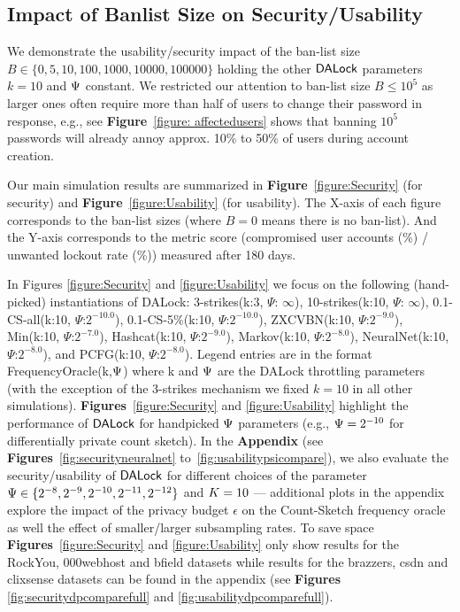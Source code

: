 	\vspace{-0.1cm}
\subsection{Impact of Banlist Size on Security/Usability}\label{section:ExperimentResult-usability} 
\vspace{-0.1cm}
We demonstrate the usability/security impact of the ban-list size $B \in \{0, 5, 10, 100, 1000, 10000,100000\}$ holding the other $\mathsf{DALock}$ parameters $k=10$ and $\Psi$ constant. We restricted our attention to ban-list size $B \leq 10^5$ as larger ones often require more than half of users to change their password in response, e.g., see \textbf{Figure}~\ref{figure: affectedusers} shows that banning $10^5$ passwords will already annoy approx. 10\% to 50\%  of users during account creation. 

Our main simulation results are summarized in \textbf{Figure}~\ref{figure:Security} (for security) and \textbf{Figure}~\ref{figure:Usability} (for usability). The X-axis of each figure corresponds to the ban-list sizes (where $B= 0$ means there is no ban-list). And the Y-axis corresponds to the metric score (compromised user accounts (\%) / unwanted lockout rate (\%)) measured after 180 days. 

 In Figures \ref{figure:Security} and \ref{figure:Usability} we focus on the following (hand-picked) instantiations of DALock: 3-strikes(k:3, $\Psi$: $\infty$), 10-strikes(k:10, $\Psi$: $\infty$), 0.1-CS-all(k:10, $\Psi$:$2^{-10.0}$), 0.1-CS-5\%(k:10, $\Psi$:$2^{-10.0}$), ZXCVBN(k:10, $\Psi$:$2^{-9.0}$), Min(k:10, $\Psi$:$2^{-7.0}$), Hashcat(k:10, $\Psi$:$2^{-9.0}$), Markov(k:10, $\Psi$:$2^{-8.0}$), NeuralNet(k:10, $\Psi$:$2^{-8.0}$), and PCFG(k:10, $\Psi$:$2^{-8.0}$). Legend entries are in the format FrequencyOracle(k,$\Psi$) where k and $\Psi$ are the DALock throttling parameters (with the exception of the 3-strikes mechanism we fixed $k=10$ in all other simulations). \textbf{Figures}~\ref{figure:Security} and \ref{figure:Usability} highlight the performance of $\mathsf{DALock}$ for handpicked $\Psi$ parameters (e.g., $\Psi = 2^{-10}$ for differentially private count sketch). In the \textbf{Appendix} (see \textbf{Figures}~\ref{fig:securityneuralnet} to~\ref{fig:usabilitypsicompare}), we also evaluate the security/usability of $\mathsf{DALock}$ for different choices of the parameter $\Psi \in \{ 2^{-8},2^{-9},2^{-10},2^{-11},2^{-12}\}$ and $K=10$ --- additional plots in the appendix explore the impact of the privacy budget $\epsilon$ on the Count-Sketch frequency oracle as well the effect of smaller/larger subsampling rates. To save space \textbf{Figures}~\ref{figure:Security} and \ref{figure:Usability} only show results for the RockYou, 000webhost and bfield datasets while results for the brazzers, csdn and clixsense datasets can be found in the appendix (see \textbf{Figures} \ref{fig:securitydpcomparefull} and \ref{fig:usabilitydpcomparefull}).

